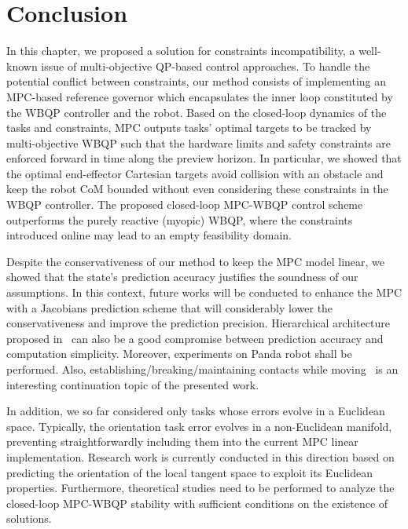 \section{Conclusion}\label{sec-chap5:conclusion}
In this chapter, we proposed a solution for constraints incompatibility, a well-known issue of multi-objective QP-based control approaches. To handle the potential conflict between constraints, our method consists of implementing an MPC-based reference governor which encapsulates the inner loop constituted by the WBQP controller and the robot. Based on the closed-loop dynamics of the tasks and constraints,  MPC outputs tasks' optimal targets to be tracked by multi-objective WBQP such that the hardware limits and safety constraints are enforced forward in time along the preview horizon. In particular, we showed that the optimal end-effector Cartesian targets avoid collision with an obstacle and keep the robot CoM bounded without even considering these constraints in the WBQP controller.
The proposed closed-loop MPC-WBQP control scheme outperforms the purely reactive (myopic) WBQP, where the constraints introduced online may lead to an empty feasibility domain. 

Despite the conservativeness of our method to keep the MPC model linear, we showed that the state's prediction accuracy justifies the soundness of our assumptions. 
In this context, future works will be conducted to enhance the MPC with a Jacobians prediction scheme that will considerably lower the conservativeness and improve the prediction precision. Hierarchical architecture proposed in~\cite{li2021ral} can also be a good compromise between prediction accuracy and computation simplicity. Moreover, experiments on Panda robot shall be performed.
Also, establishing/breaking/maintaining contacts while moving~\cite{romualdi2022icra} is an interesting continuation topic of the presented work. 

In addition, we so far considered only tasks whose errors evolve in a Euclidean space. Typically, the orientation task error evolves in a non-Euclidean manifold, preventing straightforwardly including them into the current MPC linear implementation. Research work is currently conducted in this direction based on predicting the orientation of the local tangent space to exploit its Euclidean properties. 
Furthermore, theoretical studies need to be performed to analyze the closed-loop MPC-WBQP stability with sufficient conditions on the existence of solutions.


